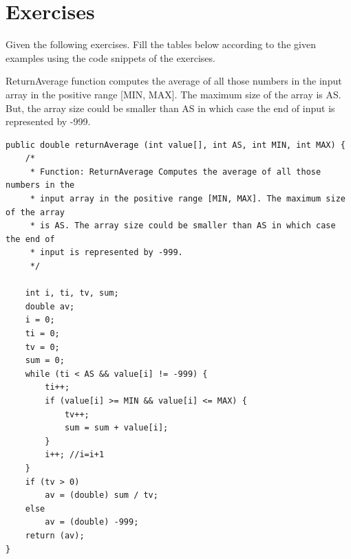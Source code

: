 \section{Exercises}
Given the following exercises. Fill the tables below according to the given examples using the code snippets of the exercises.

\begin{exercise}
    ReturnAverage function computes the average of all those numbers in the input array in the positive range [MIN, MAX]. The maximum size of the array is AS. But, the array size could be smaller than AS in which case the end of input is represented by -999.
    
    \begin{lstlisting}
public double returnAverage (int value[], int AS, int MIN, int MAX) {
    /*
     * Function: ReturnAverage Computes the average of all those numbers in the
     * input array in the positive range [MIN, MAX]. The maximum size of the array
     * is AS. The array size could be smaller than AS in which case the end of
     * input is represented by -999.
     */

    int i, ti, tv, sum;
    double av;
    i = 0;
    ti = 0;
    tv = 0;
    sum = 0;
    while (ti < AS && value[i] != -999) {
        ti++;
        if (value[i] >= MIN && value[i] <= MAX) {
            tv++;
            sum = sum + value[i];
        }
        i++; //i=i+1
    }
    if (tv > 0)
        av = (double) sum / tv;
    else
        av = (double) -999;
    return (av);
}
    \end{lstlisting}
    

\end{exercise}
